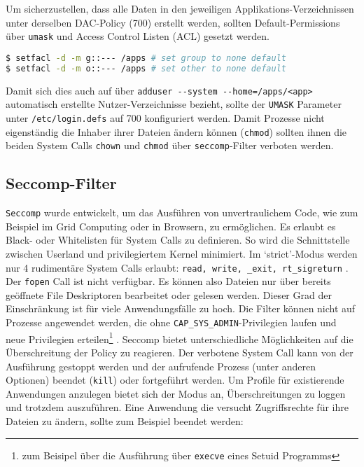 Um sicherzustellen, dass alle Daten in den jeweiligen Applikations-Verzeichnissen unter derselben DAC-Policy (700) erstellt werden, sollten Default-Permissions über \texttt{umask} und Access Control Listen (ACL) gesetzt werden. 

\begin{lstlisting}[language=bash]
$ setfacl -d -m g::--- /apps # set group to none default
$ setfacl -d -m o::--- /apps # set other to none default
\end{lstlisting}

Damit sich dies auch auf über \texttt{adduser -{}-system -{}-home=/apps/<app>} automatisch erstellte Nutzer-Verzeichnisse bezieht, sollte der \texttt{UMASK} Parameter unter \texttt{/etc/login.defs} auf 700 konfiguriert werden. Damit Prozesse nicht eigenständig die Inhaber ihrer Dateien ändern können (\texttt{chmod}) sollten ihnen die beiden System Calls \texttt{chown} und \texttt{chmod} über \texttt{seccomp}-Filter verboten werden. 

\subsection{Seccomp-Filter}
\label{sec:seccomp}

\texttt{Seccomp} wurde entwickelt, um das Ausführen von unvertraulichem Code, wie zum Beispiel im Grid Computing oder in Browsern, zu ermöglichen. Es erlaubt es Black- oder Whitelisten für System Calls zu definieren. So wird die Schnittstelle zwischen Userland und privilegiertem Kernel minimiert.
Im `strict'-Modus werden nur 4 rudimentäre System Calls erlaubt: \texttt{read, write, \_exit, rt\_sigreturn} \cite{man-seccomp}. Der \texttt{fopen} Call ist nicht verfügbar. Es können also Dateien nur über bereits geöffnete File Deskriptoren bearbeitet oder gelesen werden. Dieser Grad der Einschränkung ist für viele Anwendungsfälle zu hoch.
Die Filter können nicht auf Prozesse angewendet werden, die ohne \texttt{CAP\_SYS\_ADMIN}-Privilegien laufen und neue Privilegien erteilen\footnote{zum Beisipel über die Ausführung über \texttt{execve} eines Setuid Programms} \cite{man-seccomp, man-prctl}.
Seccomp bietet unterschiedliche Möglichkeiten auf die Überschreitung der Policy zu reagieren. Der verbotene System Call kann von der Ausführung gestoppt werden und der aufrufende Prozess (unter anderen Optionen) beendet (\texttt{kill}) oder fortgeführt werden. Um Profile für existierende Anwendungen anzulegen bietet sich der Modus an, Überschreitungen zu loggen und trotzdem auszuführen. Eine Anwendung die versucht Zugriffsrechte für ihre Dateien zu ändern, sollte zum Beispiel beendet
werden:

